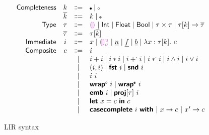 \documentclass[index.tex]{subfiles}
\begin{document}
\begin{figure}
  \[\begin{array}{rccl}
    \SortNComplete & \SortNCompleteVar & \Coloneqq & \CNC \mid \CNI \\
    \SortComplete  & \SortCompleteVar  & \Coloneqq & \SortNCompleteVar \mid \CII \\
    \SortTypCon    & \SortTypConVar    & \Coloneqq & \TCHole \mid \TCInt \mid \TCFloat \mid \TCBool 
                                                   \mid \TCPair{\SortTypConVar}{\SortTypConVar} 
                                                   \mid \TCFun{\TMk{\SortTypConVar}{\SortNCompleteVar}}{\SortTypVar} \\
    \SortTyp       & \SortTypVar       & \Coloneqq & \TMk{\SortTypConVar}{\SortCompleteVar} \\
    \SortImm       & \SortImmVar       & \Coloneqq & x \mid \EEHole{\SortHoleIdVar}{\SortHoleEnvVar}
                                                   \mid \EIntLit \mid \EFloatLit \mid \EBoolLit 
                                                   \mid \EFun{x}{\TMk{\SortTypConVar}{\SortNCompleteVar}}{\SortCompVar} \\
    \SortComp      & \SortCompVar      & \Coloneqq & \SortImmVar \\
                   &                   & \mid         & \EPlus{\SortImmVar}{\SortImmVar} 
                                                   \mid \ETimes{\SortImmVar}{\SortImmVar}
                                                   \mid \EFPlus{\SortImmVar}{\SortImmVar} 
                                                   \mid \EFTimes{\SortImmVar}{\SortImmVar}
                                                   \mid \EAnd{\SortImmVar}{\SortImmVar}
                                                   \mid \EOr{\SortImmVar}{\SortImmVar} \\
                   &                   & \mid         & \EPair{\SortImmVar}{\SortImmVar}
                                                   \mid \EProjL{\SortImmVar}
                                                   \mid \EProjR{\SortImmVar} \\
                   &                   & \mid         & \EAp{\SortImmVar}{\SortImmVar} \\
                   &                   & \mid         & \EWrapIntoNI{\SortImmVar}
                                                   \mid \EWrapIntoII{\SortImmVar} \\
                   &                   & \mid         & \EEmbed{\SortImmVar}
                                                   \mid \EProj{\SortImmVar}{\SortTypConVar} \\
                   &                   & \mid         & \ELet{x}{\SortCompVar} \EInn{\SortCompVar} \\
                   &                   & \mid         & \ECaseCompleteWith{\SortImmVar}
                                                    ~\ECaseCompleteBranch{x}{\SortCompVar}
                                                    ~\ECaseCompleteBranch{x'}{\SortCompVar}
  \end{array}\]
  \caption{LIR syntax}
  \label{fig:lir-syntax}
\end{figure}
\end{document}
